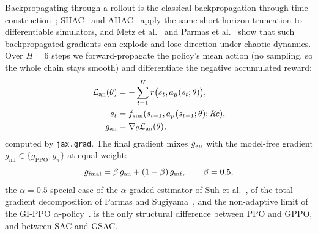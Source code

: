 Backpropagating through a rollout is the classical
backpropagation-through-time construction~\cite{werbos1990bptt}; SHAC~\cite{shac2022}
and AHAC~\cite{ahac2024} apply the same short-horizon truncation to
differentiable simulators, and Metz et al.~\cite{metz2021} and Parmas et
al.~\cite{parmas2018pipps} show that such backpropagated gradients can
explode and lose direction under chaotic dynamics. Over $H=6$ steps we
forward-propagate the policy's mean action (no sampling, so the whole chain
stays smooth) and differentiate the negative accumulated reward:
\begin{equation}
  \begin{split}
    \mathcal{L}_{\mathrm{an}}(\theta)&=-\sum_{t=1}^{H}r\big(s_t,a_\mu(s_t;\theta)\big),\\
    s_t&=f_{\mathrm{sim}}(s_{t-1},a_\mu(s_{t-1};\theta);\mathit{Re}),\\
    g_{\mathrm{an}}&=\nabla_\theta\mathcal{L}_{\mathrm{an}}(\theta),
  \end{split}
  \label{eq:analytic}
\end{equation}
computed by \texttt{jax.grad}. The final gradient mixes $g_{\mathrm{an}}$ with the
model-free gradient $g_{\mathrm{mf}}\in\{g_{\mathrm{PPO}},g_\pi\}$ at equal
weight:
\begin{equation}
  g_{\mathrm{final}}=\beta\,g_{\mathrm{an}}+(1-\beta)\,g_{\mathrm{mf}},\qquad \beta=0.5,
  \label{eq:mix}
\end{equation}
the $\alpha=0.5$ special case of the $\alpha$-graded estimator of Suh et
al.~\cite{suh2022}, of the total-gradient decomposition of Parmas and
Sugiyama~\cite{parmas2018total}, and the non-adaptive limit of the GI-PPO
$\alpha$-policy~\cite{gippo2023}.  is the only structural
difference between PPO and GPPO, and between SAC and GSAC.


